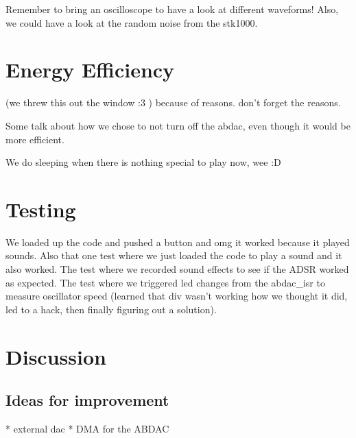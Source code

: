 

Remember to bring an oscilloscope to have a look at different waveforms! Also, we could have a look at the random noise from the stk1000.

\section{Energy Efficiency}

(we threw this out the window :3 )
because of reasons. don't forget the reasons.

Some talk about how we chose to not turn off the abdac, even though it would be more efficient.

We do sleeping when there is nothing special to play now, wee :D


\section{Testing}
We loaded up the code and pushed a button and omg it worked because it played sounds.
Also that one test where we just loaded the code to play a sound and it also worked.
The test where we recorded sound effects to see if the ADSR worked as expected.
The test where we triggered led changes from the abdac_isr to measure oscillator speed (learned that div wasn't working how we thought it did, led to a hack, then finally figuring out a solution).


\section{Discussion}

\subsection{Ideas for improvement}

* external dac
* DMA for the ABDAC

